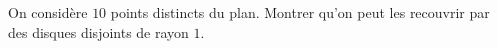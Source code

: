 On considère $10$ points distincts du plan. Montrer qu'on peut les recouvrir par des disques disjoints de rayon $1$.